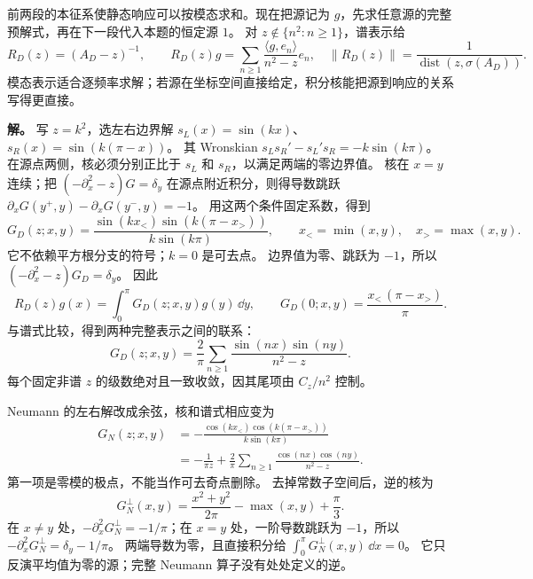 \begin{exbox}
前两段的本征系使静态响应可以按模态求和。现在把源记为 $g$，先求任意源的完整预解式，再在下一段代入本题的恒定源 $1$。
对 $z\notin\{n^2:n\ge1\}$，谱表示给
\[
 R_D(z)=(A_D-z)^{-1},\qquad
 R_D(z)g=\sum_{n\ge1}\frac{\langle g,e_n\rangle}{n^2-z}e_n,
 \quad \|R_D(z)\|=\frac1{\operatorname{dist}(z,\sigma(A_D))}.
\]
模态表示适合逐频率求解；若源在坐标空间直接给定，积分核能把源到响应的关系写得更直接。

\textbf{解。} 写 $z=k^2$，选左右边界解 $s_L(x)=\sin(kx)$、$s_R(x)=\sin(k(\pi-x))$。
其 Wronskian $s_Ls_R'-s_L's_R=-k\sin(k\pi)$。
在源点两侧，核必须分别正比于 $s_L$ 和 $s_R$，以满足两端的零边界值。
核在 $x=y$ 连续；把 $(-\partial_x^2-z)G=\delta_y$ 在源点附近积分，则得导数跳跃
$\partial_xG(y^+,y)-\partial_xG(y^-,y)=-1$。
用这两个条件固定系数，得到
\[
 G_D(z;x,y)=\frac{\sin(kx_<)\sin(k(\pi-x_>))}{k\sin(k\pi)},
 \qquad x_<=\min(x,y),\quad x_>=\max(x,y).
\]
它不依赖平方根分支的符号；$k=0$ 是可去点。
边界值为零、跳跃为 $-1$，所以 $(-\partial_x^2-z)G_D=\delta_y$。
因此
\[
 R_D(z)g(x)=\int_0^\pi G_D(z;x,y)g(y)\,\dd y,
 \qquad
 G_D(0;x,y)=\frac{x_<\,(\pi-x_>)}\pi.
\]
与谱式比较，得到两种完整表示之间的联系：
\[
 G_D(z;x,y)=\frac2\pi\sum_{n\ge1}\frac{\sin(nx)\sin(ny)}{n^2-z}.
\]
每个固定非谱 $z$ 的级数绝对且一致收敛，因其尾项由 $C_z/n^2$ 控制。

Neumann 的左右解改成余弦，核和谱式相应变为
\begin{align*}
 G_N(z;x,y)&=-\frac{\cos(kx_<)\cos(k(\pi-x_>))}{k\sin(k\pi)}\\
 &=-\frac1{\pi z}+\frac2\pi\sum_{n\ge1}\frac{\cos(nx)\cos(ny)}{n^2-z}.
\end{align*}
第一项是零模的极点，不能当作可去奇点删除。
去掉常数子空间后，逆的核为
\[
 G_N^\perp(x,y)=\frac{x^2+y^2}{2\pi}-\max(x,y)+\frac\pi3.
\]
在 $x\ne y$ 处，$-\partial_x^2G_N^\perp=-1/\pi$；在 $x=y$ 处，一阶导数跳跃为 $-1$，所以
$-\partial_x^2G_N^\perp=\delta_y-1/\pi$。
两端导数为零，且直接积分给 $\int_0^\pi G_N^\perp(x,y)\,\dd x=0$。
它只反演平均值为零的源；完整 Neumann 算子没有处处定义的逆。
\end{exbox}

